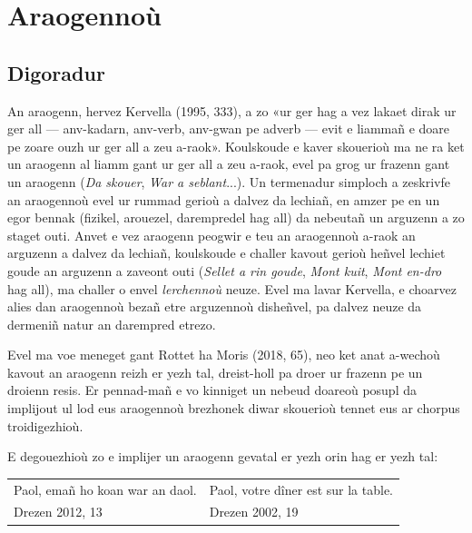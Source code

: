 \chapter{Araogennoù}

\section{Digoradur}\label{digoradur}

An araogenn, hervez Kervella (1995, 333), a zo «ur ger hag a vez lakaet dirak ur ger all --- anv-kadarn, anv-verb, anv-gwan pe adverb --- evit e liammañ e doare pe zoare ouzh ur ger all a zeu a-raok». Koulskoude e kaver skouerioù ma ne ra ket un araogenn al liamm gant ur ger all a zeu a-raok, evel pa grog ur frazenn gant un araogenn (\emph{Da skouer}, \emph{War a seblant}...). Un termenadur simploc\textquotesingle h a zeskrivfe an araogennoù evel ur rummad gerioù a dalvez da lec\textquotesingle hiañ, en amzer pe en un egor bennak (fizikel, arouezel, darempredel hag all) da nebeutañ un arguzenn a zo staget outi. Anvet e vez araogenn peogwir e teu an araogennoù a-raok an arguzenn a dalvez da lec\textquotesingle hiañ, koulskoude e c\textquotesingle haller kavout gerioù heñvel lec\textquotesingle hiet goude an arguzenn a zaveont outi (\emph{Sellet a rin goude}, \emph{Mont kuit}, \emph{Mont en-dro} hag all), ma c\textquotesingle haller o envel \emph{lerc\textquotesingle hennoù} neuze. Evel ma lavar Kervella, e c\textquotesingle hoarvez alies d\textquotesingle an araogennoù bezañ etre arguzennoù disheñvel, pa dalvez neuze da dermeniñ natur an darempred etrezo.

Evel ma voe meneget gant Rottet ha Moris (2018, 65), n\textquotesingle eo ket anat a-wechoù kavout an araogenn reizh er yezh tal, dreist-holl pa droer ur frazenn pe un droienn resis. Er pennad-mañ e vo kinniget un nebeud doareoù posupl da implijout ul lod eus araogennoù brezhonek diwar skouerioù tennet eus ar c\textquotesingle horpus troidigezhioù.

E degouezhioù zo e implijer un araogenn gevatal er yezh orin hag er yezh tal:

\begin{longtable}[]{|p{}|p{}}

Paol, emañ ho koan war an daol. & Paol, votre dîner est sur la table. \\ Drezen 2012, 13 & Drezen 2002, 19 \\ \end{longtable}

